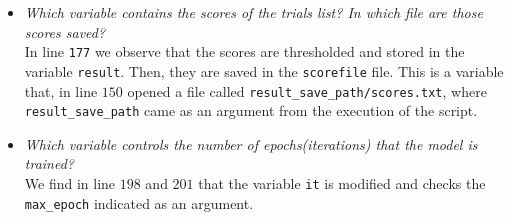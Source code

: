 \documentclass[a4paper]{article}
\def\inline{\lstinline[basicstyle=\ttfamily,keywordstyle={}]}
\begin{document}
\begin{itemize}
  \item \emph{Which variable contains the scores of the trials list? In which file are those scores saved?}\\

        In line \inline{177} we observe that the scores are thresholded and stored in the variable \inline{result}. Then, they are saved in the \inline{scorefile} file. This is a variable that, in line \(150\) opened a file called \inline{result_save_path/scores.txt}, where \inline{result_save_path} came as an argument from the execution of the script.

  \item \emph{Which variable controls the number of epochs(iterations) that the model is trained?}\\

        We find in line \(198\) and \(201\) that the variable \inline{it} is modified and checks the \inline{max_epoch} indicated as an argument.


\end{itemize}
\end{document}
